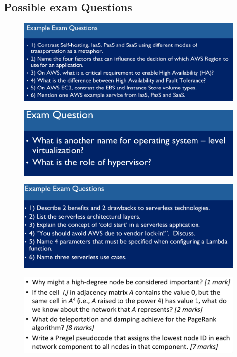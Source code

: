 \documentclass[a4paper]{article}
\begin{document}
\begin{multicols}{3}
\section{Possible exam Questions}

\begin{figure}[H]
    \includegraphics[width=\linewidth]{ExampleExamQuestions01.png}
    \label{fig:examquestion01}
\end{figure}

\begin{figure}[H]
    \includegraphics[width=\linewidth]{ExampleExamQuestions02.png}
    \label{fig:examquestion02}
\end{figure}

\begin{figure}[H]
    \includegraphics[width=\linewidth]{ExampleExamQuestions03.png}
    \label{fig:examquestion03}
\end{figure}

\begin{figure}[H]
    \includegraphics[width=\linewidth]{ExampleExamQuestions04.png}
    \label{fig:examquestion04}
\end{figure}


\end{multicols}
\end{document}
